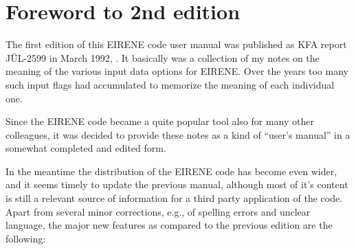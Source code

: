 
\section*{Foreword to 2nd edition}
\label{forew2}
\bigskip

The first edition of this EIRENE code user manual was published as KFA
report J\"UL-2599 in March 1992, \cite{kn:Reiter92a}. It basically was a collection of
my notes on the meaning of the various input data options for EIRENE.
Over the years too many such input flags had accumulated to memorize
the meaning of each individual one.

Since the EIRENE code became a quite popular tool also for many other
colleagues, it was decided to provide these notes as a kind of ``user's
manual'' in a somewhat completed and edited form.

In the meantime the distribution of the EIRENE code has become even
wider, and it seems timely to update the previous manual, although
most of it's content is still a relevant source of information for
a third party application of the code. Apart from several minor corrections, e.g.,
of spelling errors and unclear language, the major new features as
compared to the previous edition are the following:


